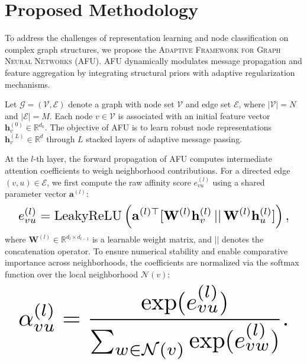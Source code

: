 \documentclass[10pt,twocolumn]{article}
\begin{document}
\section{Proposed Methodology}
To address the challenges of representation learning and node classification on complex graph structures, we propose the \textsc{Adaptive Framework for Graph Neural Networks (\textsc{AFU})}. \textsc{AFU} dynamically modulates message propagation and feature aggregation by integrating structural priors with adaptive regularization mechanisms.

Let $\mathcal{G} = (\mathcal{V}, \mathcal{E})$ denote a graph with node set $\mathcal{V}$ and edge set $\mathcal{E}$, where $|\mathcal{V}| = N$ and $|\mathcal{E}| = M$. Each node $v \in \mathcal{V}$ is associated with an initial feature vector $\mathbf{h}_v^{(0)} \in \mathbb{R}^{d_0}$. The objective of \textsc{AFU} is to learn robust node representations $\mathbf{h}_v^{(L)} \in \mathbb{R}^d$ through $L$ stacked layers of adaptive message passing.

At the $l$-th layer, the forward propagation of \textsc{AFU} computes intermediate attention coefficients to weigh neighborhood contributions. For a directed edge $(v, u) \in \mathcal{E}$, we first compute the raw affinity score $e_{vu}^{(l)}$ using a shared parameter vector $\mathbf{a}^{(l)}$:
\begin{equation}
\resizebox{0.95\columnwidth}{!}{\ensuremath{\displaystyle e_{vu}^{(l)} = \text{LeakyReLU}\left(\mathbf{a}^{(l)\top} 
  [\mathbf{W}^{(l)}\mathbf{h}_v^{(l)} \,||\, 
  \mathbf{W}^{(l)}\mathbf{h}_u^{(l)}]\right),}}
\end{equation}
where $\mathbf{W}^{(l)} \in \mathbb{R}^{d_l \times d_{l-1}}$ is a learnable weight matrix, and $||$ denotes the concatenation operator. To ensure numerical stability and enable comparative importance across neighborhoods, the coefficients are normalized via the softmax function over the local neighborhood $\mathcal{N}(v)$:
\begin{equation}
\resizebox{0.95\columnwidth}{!}{\ensuremath{\displaystyle \alpha_{vu}^{(l)} = \frac{\exp(e_{vu}^{(l)})}{
    \sum_{w \in \mathcal{N}(v)} \exp(e_{vw}^{(l)})
  }.}}
\end{equation}
\end{document}
